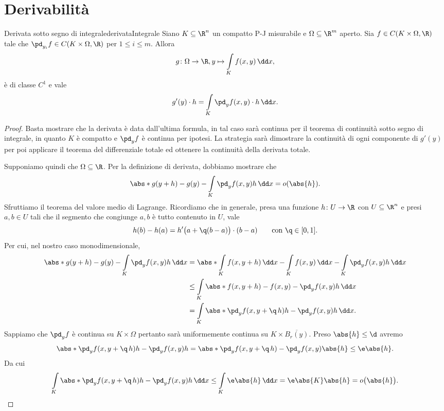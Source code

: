 \section{Derivabilità}

\begin{teor}{Derivata sotto segno di integrale}{derivataIntegrale}
	Siano \(K\subseteq \R^n\) un compatto P-J misurabile e \(\Omega \subseteq \R^m\) aperto.
	Sia \(f\in C(K\times \Omega,\R)\) tale che \(\pd_{y_i}f\in C(K\times \Omega,\R)\) per \(1\le i \le m\).
	Allora
	\[
		g\colon \Omega \to \R, y \mapsto \int\limits_K f(x,y)\,\dd x,
	\]
	è di classe \(C^1\) e vale
	\[
		g'(y) \cdot h = \int\limits_K \pd_y f(x,y) \cdot h\,\dd x.
	\]
\end{teor}

\begin{proof}
	Basta mostrare che la derivata è data dall'ultima formula, in tal caso sarà continua per il teorema di continuità sotto segno di integrale, in quanto \(K\) è compatto e \(\pd_y f\) è continua per ipotesi.
	La strategia sarà dimostrare la continuità di ogni componente di \(g'(y)\) per poi applicare il teorema del differenziale totale ed ottenere la continuità della derivata totale.

	Supponiamo quindi che \(\Omega \subseteq \R\). Per la definizione di derivata, dobbiamo mostrare che
	\[
		\abs*{g(y+h)-g(y)-\int\limits_K \pd_y f(x,y) h\,\dd x} = o(\abs{h}).
	\]
	Sfruttiamo il teorema del valore medio di Lagrange.
	Ricordiamo che in generale, presa una funzione \(h\colon U \to \R\) con \(U\subseteq \R^n\) e presi \(a,b \in U\) tali che il segmento che congiunge \(a,b\) è tutto contenuto in \(U\), vale
	\[
		h(b)-h(a) = h'\big(a+\q(b-a)\big)\cdot (b-a) \qquad\text{con }\q\in[0,1].
	\]
	Per cui, nel nostro caso monodimensionale,
	\[
		\begin{split}
			\abs*{g(y+h)-g(y)-\int\limits_K \pd_y f(x,y) h\,\dd x} & = \abs*{\int\limits_K f(x,y+h)\,\dd x-\int\limits_K f(x,y)\,\dd x-\int\limits_K \pd_y f(x,y) h\,\dd x}\\
			& \le \int\limits_K \abs*{f(x,y+h)-f(x,y)-\pd_y f(x,y) h}\,\dd x\\
			& = \int\limits_K \abs*{\pd_y f(x,y+\q\,h) h - \pd_y f(x,y) h}\,\dd x.
		\end{split}
	\]
	Sappiamo che \(\pd_y f\) è continua su \(K\times \Omega\) pertanto sarà uniformemente continua su \(K \times \overline{B_r(y)}\).
	Preso \(\abs{h}\le\d\) avremo
	\[
		\abs*{\pd_y f(x,y+\q\,h)h-\pd_y f(x,y)h} = \abs*{\pd_y f(x,y+\q\,h)-\pd_y f(x,y)}\abs{h} \le \e \abs{h}.
	\]
	Da cui
	\[
		\int\limits_K \abs*{\pd_y f(x,y+\q\,h) h - \pd_y f(x,y) h}\,\dd x \le \int\limits_K \e \abs{h}\,\dd x = \e \abs{K}\abs{h} = o\big(\abs{h}\big).\qedhere
	\]
\end{proof}

